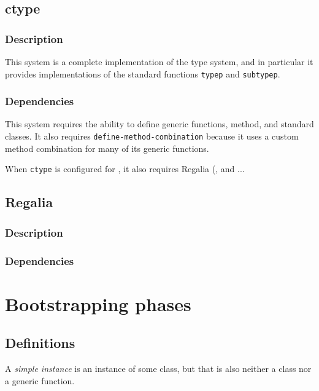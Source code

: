 \subsection{ctype}
\label{sec-subtype}

\subsubsection{Description}

This system is a complete implementation of the \commonlisp{} type
system, and in particular it provides implementations of the standard
functions \texttt{typep} and \texttt{subtypep}.

\subsubsection{Dependencies}

This system requires the ability to define generic functions, method,
and standard classes.  It also requires
\texttt{define-method-combination} because it uses a custom method
combination for many of its generic functions.

When \texttt{ctype} is configured for \sysname{}, it also requires
Regalia (, and ...

\subsection{Regalia}
\label{sec-regalia}

\subsubsection{Description}

\subsubsection{Dependencies}

\section{Bootstrapping phases}

\subsection{Definitions}

\begin{definition}
A \emph{simple instance} is an instance of some class, but that is
also neither a class nor a generic function.
\end{definition}

